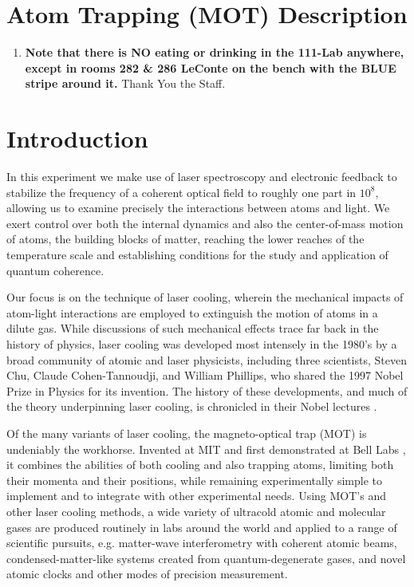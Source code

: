 \documentclass{../lab}
\begin{document}
\maketitle

\tableofcontents

\section{Atom Trapping (MOT) Description}

\begin{enumerate}
    \item \textbf{Note that there is NO eating or drinking in the 111-Lab anywhere, except in rooms 282 \& 286 LeConte on the bench with the BLUE stripe around it.} Thank You the Staff.
\end{enumerate}

\section{Introduction}

In this experiment we make use of laser spectroscopy and electronic feedback to stabilize the frequency of a coherent optical field to roughly one part in $10^8$, allowing us to examine precisely the interactions between atoms and light. We exert control over both the internal dynamics and also the center-of-mass motion of atoms, the building blocks of matter, reaching the lower reaches of the temperature scale and establishing conditions for the study and application of quantum coherence.

Our focus is on the technique of laser cooling, wherein the mechanical impacts of atom-light interactions are employed to extinguish the motion of atoms in a dilute gas. While discussions of such mechanical effects trace far back in the history of physics, laser cooling was developed most intensely in the 1980’s by a broad community of atomic and laser physicists, including three scientists, Steven Chu, Claude Cohen-Tannoudji, and William Phillips, who shared the 1997 Nobel Prize in Physics for its invention. The history of these developments, and much of the theory underpinning laser cooling, is chronicled in their Nobel lectures \cite{Chu,Cohen-Tannoudji,Phillips}.

Of the many variants of laser cooling, the magneto-optical trap (MOT) is undeniably the workhorse. Invented at MIT and first demonstrated at Bell Labs \cite{Raab}, it combines the abilities of both cooling and also trapping atoms, limiting both their momenta and their positions, while remaining experimentally simple to implement and to integrate with other experimental needs. Using MOT’s and other laser cooling methods, a wide variety of ultracold atomic and molecular gases are produced routinely in labs around the world and applied to a range of scientific pursuits, e.g. matter-wave interferometry with coherent atomic beams, condensed-matter-like systems created from quantum-degenerate gases, and novel atomic clocks and other modes of precision measurement.
\end{document}
